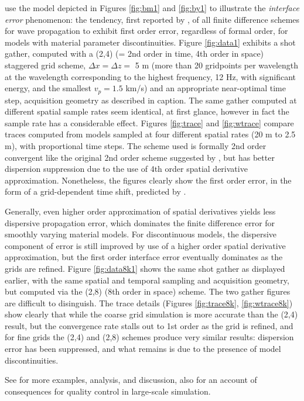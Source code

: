 \cite{SymesVdovina:09} use the model depicted in Figures \ref{fig:bm1} and \ref{fig:by1} to illustrate the {\em
  interface error} phenomenon: the tendency, first reported by
\cite{Brown:84}, of all finite difference schemes for wave
propagation to exhibit first order error, regardless of formal order,
for models with material parameter discontinuities. 
Figure \ref{fig:data1} exhibits a shot gather, computed with a (2,4) (= 2nd order in time,
4th order in space) staggered grid scheme, $\Delta
x = \Delta z = $ 5 m (more than 20 gridpoints per wavelength at the
wavelength corresponding to the highest frequency, 12 Hz, with
significant energy, and the smallest $v_p=1.5$ km/s)  and an appropriate near-optimal time step, acquisition geometry as described in
caption. The same gather computed at different spatial sample rates
seem identical, at first glance, however in fact the sample rate has a considerable effect. Figures
\ref{fig:trace} and \ref{fig:wtrace} compare traces computed from models sampled
at four different spatial rates (20 m to 2.5 m), with proportional
time steps. The scheme used is formally 2nd order
convergent like the original 2nd order scheme suggested by
\cite{Vir:84}, but has better dispersion suppression due to the use of
4th order spatial derivative approximation. Nonetheless,
the figures clearly show the first order error, in the form of a
grid-dependent time shift, predicted by \cite{Brown:84}. 

Generally, even higher order approximation of spatial derivatives
yields less dispersive propagation error, which dominates the finite
difference error for smoothly varying material models. For
discontinuous models, the dispersive component of error is still
improved by use of a higher order spatial derivative approximation,
but the first order interface error eventually dominates as the grids
are refined. Figure \ref{fig:data8k1} shows the same shot gather as
displayed earlier, with the same spatial and temporal sampling and
acquisition geometry, but computed via the (2,8) (8th order in space)
scheme. The two gather figures are difficult to disinguish. The trace
details (Figures \ref{fig:trace8k}, \ref{fig:wtrace8k}) show clearly
that while the coarse grid simulation is more accurate than the (2,4)
result, but the convergence rate stalls out to 1st order as the grid
is refined, and for fine grids the (2,4) and (2,8) schemes produce
very similar results: dispersion error has been suppressed, and what
remains is due to the presence of model discontinuities.

See
\cite{SymesVdovina:09} for more examples, analysis, and discussion,
also \cite{FehlerKeliher:11} for an account of consequences for quality control in
large-scale simulation.

